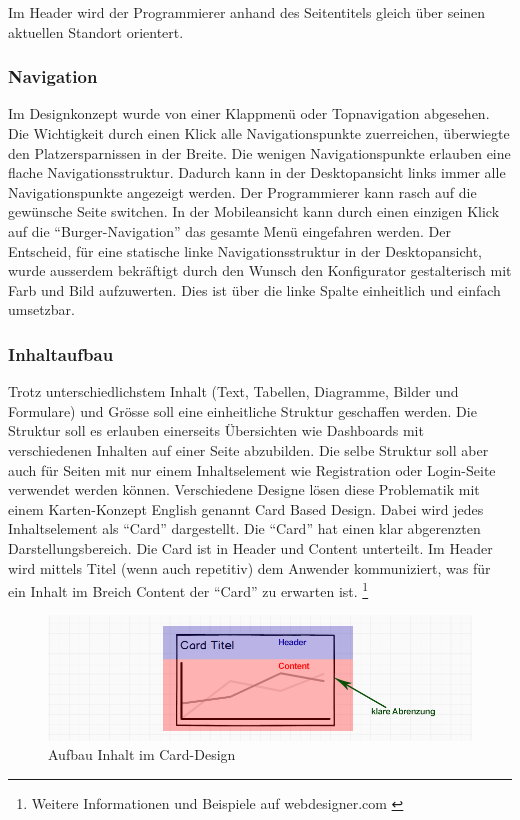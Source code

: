 Im Header wird der Programmierer anhand des Seitentitels gleich über
seinen aktuellen Standort orientert.

\subsubsection{Navigation}\label{navigation}

Im Designkonzept wurde von einer Klappmenü oder Topnavigation abgesehen.
Die Wichtigkeit durch einen Klick alle Navigationspunkte zuerreichen,
überwiegte den Platzersparnissen in der Breite. Die wenigen
Navigationspunkte erlauben eine flache Navigationsstruktur. Dadurch kann
in der Desktopansicht links immer alle Navigationspunkte angezeigt
werden. Der Programmierer kann rasch auf die gewünsche Seite switchen.
In der Mobileansicht kann durch einen einzigen Klick auf die
``Burger-Navigation'' das gesamte Menü eingefahren werden. Der
Entscheid, für eine statische linke Navigationsstruktur in der
Desktopansicht, wurde ausserdem bekräftigt durch den Wunsch den
Konfigurator gestalterisch mit Farb und Bild aufzuwerten. Dies ist über
die linke Spalte einheitlich und einfach umsetzbar.

\subsubsection{Inhaltaufbau}\label{inhaltaufbau}

Trotz unterschiedlichstem Inhalt (Text, Tabellen, Diagramme, Bilder und
Formulare) und Grösse soll eine einheitliche Struktur geschaffen werden.
Die Struktur soll es erlauben einerseits Übersichten wie Dashboards mit
verschiedenen Inhalten auf einer Seite abzubilden. Die selbe Struktur
soll aber auch für Seiten mit nur einem Inhaltselement wie Registration
oder Login-Seite verwendet werden können. Verschiedene Designe lösen
diese Problematik mit einem Karten-Konzept English genannt Card Based
Design. Dabei wird jedes Inhaltselement als ``Card'' dargestellt. Die
``Card'' hat einen klar abgerenzten Darstellungsbereich. Die Card ist in
Header und Content unterteilt. Im Header wird mittels Titel (wenn auch
repetitiv) dem Anwender kommuniziert, was für ein Inhalt im Breich
Content der ``Card'' zu erwarten ist. \footnote{Weitere Informationen
  und Beispiele auf webdesigner.com \autocite{card-based-design}}

\begin{figure}[htbp]
\centering
\includegraphics{images/mockups/card.jpg}
\caption{Aufbau Inhalt im Card-Design}
\end{figure}

